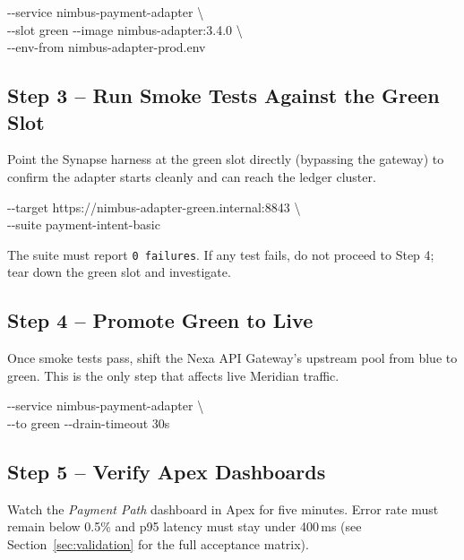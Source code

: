 \begin{cmdbox}
\hspace*{1.4em}-{}-service nimbus-payment-adapter \textbackslash\\
\hspace*{1.4em}-{}-slot green -{}-image nimbus-adapter:3.4.0 \textbackslash\\
\hspace*{1.4em}-{}-env-from nimbus-adapter-prod.env
\end{cmdbox}

\subsection{Step 3 -- Run Smoke Tests Against the Green Slot}
Point the Synapse harness at the green slot directly (bypassing the gateway) to confirm the
adapter starts cleanly and can reach the ledger cluster.

\begin{cmdbox}
\hspace*{1.4em}-{}-target https://nimbus-adapter-green.internal:8843 \textbackslash\\
\hspace*{1.4em}-{}-suite payment-intent-basic
\end{cmdbox}

The suite must report \texttt{0 failures}. If any test fails, do not proceed to Step 4; tear
down the green slot and investigate.

\subsection{Step 4 -- Promote Green to Live}
Once smoke tests pass, shift the Nexa API Gateway's upstream pool from blue to green. This is
the only step that affects live Meridian traffic.

\begin{cmdbox}
\hspace*{1.4em}-{}-service nimbus-payment-adapter \textbackslash\\
\hspace*{1.4em}-{}-to green -{}-drain-timeout 30s
\end{cmdbox}

\subsection{Step 5 -- Verify Apex Dashboards}
Watch the \emph{Payment Path} dashboard in Apex for five minutes. Error rate must remain below
0.5\% and p95 latency must stay under 400\,ms (see Section~\ref{sec:validation} for the full
acceptance matrix).

